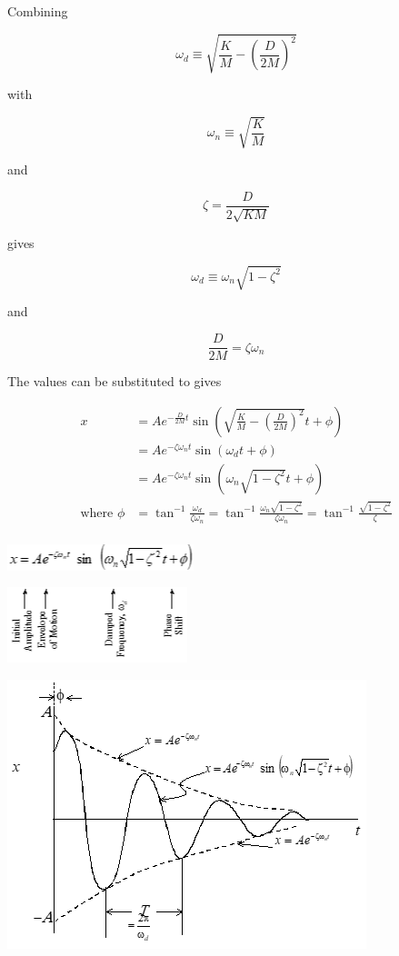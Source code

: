 \documentclass[
]{book}
\begin{document}
Combining

\[
\omega_d \equiv \sqrt{\frac{K}{M} - \left(\frac{D}{2M} \right)^2}
\]

with

\[
\omega_n \equiv \sqrt{\frac{K}{M}}
\]

and

\[
\zeta = \frac{D}{ 2 \sqrt{KM} }
\]

gives

\[
\omega_d \equiv \omega_n \sqrt{1 - \zeta^2}
\]

and

\[
\frac{D}{2M} = \zeta \omega_n
\]

The values can be substituted to gives

\begin{align}
x &= A e^{-\frac{D}{2M} t} \sin \left( \sqrt{\frac{K}{M} - \left(\frac{D}{2M} \right)^2} t + \phi  \right) \\
&= A e^{-\zeta \omega_n t} \sin \left( \omega_d t + \phi  \right) \\
&= A e^{-\zeta \omega_n t} \sin \left( \omega_n \sqrt{1 - \zeta^2} t + \phi  \right) \\
\text{where } \phi &= \tan^{-1} \frac{\omega_d}{\zeta \omega_n} =  \tan^{-1} \frac{\omega_n \sqrt{1 - \zeta^2}}{\zeta \omega_n} =  \tan^{-1} \frac{\sqrt{1 - \zeta^2}}{\zeta} \\
\end{align}

\includegraphics{media/08/image43.png}

\includegraphics{media/08/image44.png}

\includegraphics{media/08/image45.png}
\end{document}
